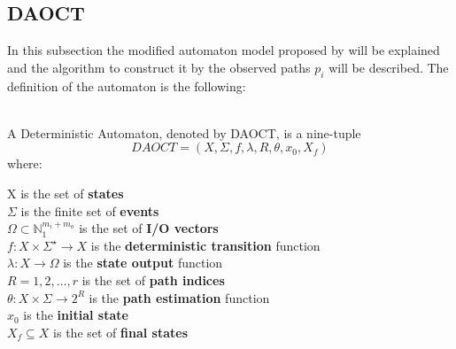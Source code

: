 \subsection{DAOCT}
In this subsection the modified automaton model proposed by
\cite{moreira2018enhanced} will be explained and the algorithm to construct it
by the observed paths $p_i$ will be described. 
The definition of the automaton is the following:
\begin{definition}[DAOCT]
  \label{def:daoct}~\\
  A Deterministic Automaton, denoted by DAOCT, is a nine-tuple
  \[ DAOCT = (X,\Sigma,f,\lambda,R,\theta, x_0,X_f)\] where:

  \indent X is the set of \textbf{states} \\
  \indent $\Sigma$ is the finite set of \textbf{events}\\
  \indent $\Omega \subset \mathbb{N}_1^{m_i+m_o} $ is the set of \textbf{I/O vectors}\\
  \indent $f:  X \times \Sigma^\star \rightarrow X$ is the \textbf{deterministic transition} function  \\
  \indent $\lambda : X \rightarrow \Omega$ is the \textbf{state output} function \\
  \indent $R = {1,2,\dots,r}$ is the set of \textbf{path indices} \\
  \indent $\theta : X \times \Sigma \rightarrow 2^R$ is the \textbf{path
    estimation} function \\
  \indent $x_0$ is the \textbf{initial state} \\
  \indent $X_f \subseteq X $ is the set of \textbf{final states}
\end{definition}

